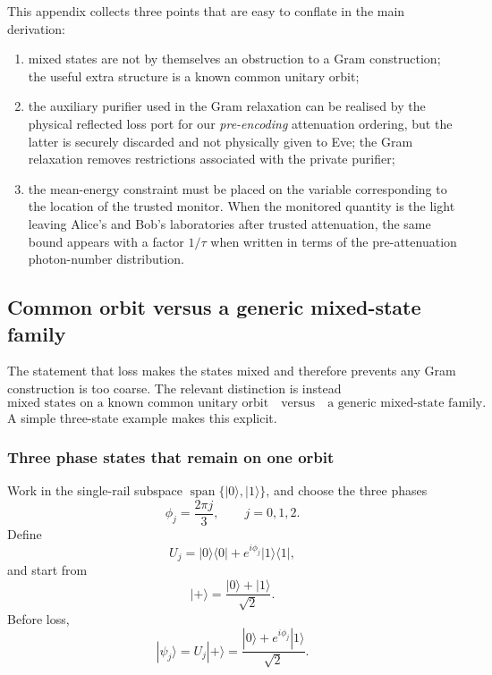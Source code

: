\documentclass[11pt]{article}
\theoremstyle{remark}
\begin{document}
This appendix collects three points that are easy to conflate in the main
derivation:

\begin{enumerate}
    \item mixed states are not by themselves an obstruction to a Gram
    construction; the useful extra structure is a known common unitary orbit;
    \item the auxiliary purifier used in the Gram relaxation can be realised
    by the physical reflected loss port for our \emph{pre-encoding}
    attenuation ordering, but the latter is securely discarded and not
    physically given to Eve; the Gram relaxation removes restrictions
    associated with the private purifier;
    \item the mean-energy constraint must be placed on the variable
    corresponding to the location of the trusted monitor.  When the monitored
    quantity is the light leaving Alice's and Bob's laboratories after trusted
    attenuation, the same bound appears with a factor \(1/\tau\) when written
    in terms of the pre-attenuation photon-number distribution.
\end{enumerate}

\subsection{Common orbit versus a generic mixed-state family}
\label{app:common-orbit-example}

The statement that loss makes the states mixed and therefore prevents any
Gram construction is too coarse.  The relevant distinction is instead
\[
    \boxed{
    \text{mixed states on a known common unitary orbit}
    \quad\text{versus}\quad
    \text{a generic mixed-state family}.
    }
\]
A simple three-state example makes this explicit.

\subsubsection{Three phase states that remain on one orbit}

Work in the single-rail subspace
\(\operatorname{span}\{|0\rangle,|1\rangle\}\), and choose the three phases
\[
    \phi_j=\frac{2\pi j}{3},
    \qquad
    j=0,1,2.
\]
Define
\[
    U_j
    =
    |0\rangle\!\langle0|
    +
    e^{i\phi_j}|1\rangle\!\langle1|,
\]
and start from
\[
    |+\rangle
    =
    \frac{|0\rangle+|1\rangle}{\sqrt2}.
\]
Before loss,
\[
    |\psi_j\rangle
    =
    U_j|+\rangle
    =
    \frac{|0\rangle+e^{i\phi_j}|1\rangle}{\sqrt2}.
\]
\end{document}
